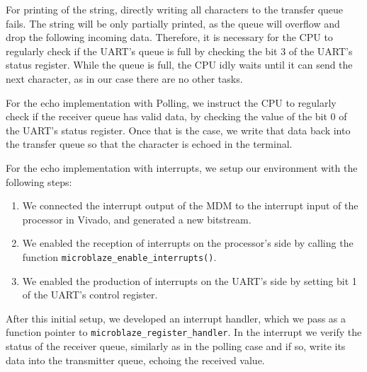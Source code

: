 \documentclass[11pt,a4paper]{article}
\begin{document}
For printing of the string, directly writing all characters to the transfer queue fails. The string will be only partially printed, as the queue will overflow and drop the following incoming data. Therefore, it is necessary for the CPU to regularly check if the UART's queue is full by checking the bit 3 of the UART's status register. While the queue is full, the CPU idly waits until it can send the next character, as in our case there are no other tasks. 

For the echo implementation with Polling, we instruct the CPU to regularly check if the receiver queue has valid data, by checking the value of the bit 0 of the UART's status register. Once that is the case, we write that data back into the transfer queue so that the character is echoed in the terminal.

For the echo implementation with interrupts, we setup our environment with the following steps:
\begin{enumerate}
\item We connected the interrupt output of the MDM to the interrupt input of the processor in Vivado, and generated a new bitstream. \item We enabled the reception of interrupts on the processor's side by calling the function \verb|microblaze_enable_interrupts()|. 
\item We enabled the production of interrupts on the UART's side by setting bit 1 of the UART's control register.
\end{enumerate}

After this initial setup, we developed an interrupt handler, which we pass as a function pointer to \verb|microblaze_register_handler|. In the interrupt we verify the status of the receiver queue, similarly as in the polling case and if so, write its data into the transmitter queue, echoing the received value.



\end{document}
